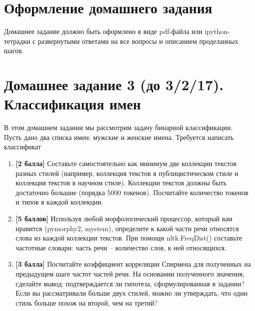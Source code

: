 \documentclass[11pt]{article}
\begin{document}
\section*{Оформление домашнего задания}
Домашнее задание должно быть оформлено в виде pdf-файла или ipython-тетрадки с развернутыми ответами на все вопросы и описанием проделанных шагов. 



\section*{Домашнее задание 3 (до \textbf{3/2/17)}. Классификация имен}

В этом домашнем задании мы рассмотрим задачу бинарной классификации. Пусть дано два списка имен: мужские и женские имена. Требуется написать классификат

\begin{enumerate}
\item \textbf{[2 балла]} Составьте самостоятельно как минимум две коллекции текстов разных стилей (например, коллекция текстов в публицистическом стиле и коллекция текстов в научном стиле). Коллекции текстов должны быть достаточно большие (порядка 5000 токенов). Посчитайте количество токенов и типов в каждой коллекции.

\item \textbf{[5 баллов]} Используя любой морфологический процессор, который вам нравится (pymorphy2, mystem), определите к какой части речи относятся слова из каждой коллекции текстов. При помощи nltk.FreqDist() составьте частотные словари: часть речи – количество слов,  к ней относящихся.


\item \textbf{[3 балла]} Посчитайте коэффициент корреляции Спирмена для полученных на предыдущем шаге частот частей речи. На основании полученного значения, сделайте вывод: подтверждается ли гипотеза, сформулированная в задании? Если вы рассматривали больше двух стилей, можно ли утверждать, что один стиль больше похож на второй, чем на третий?

\end{enumerate}
\end{document}
